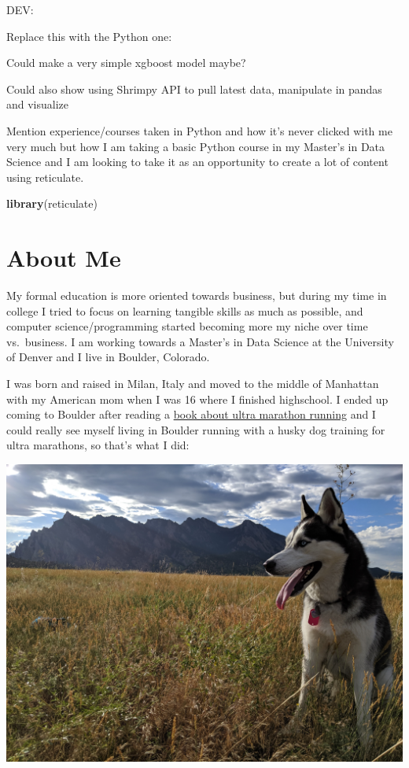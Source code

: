 \documentclass[
]{book}
\newenvironment{Shaded}{\begin{snugshade}}{\end{snugshade}}
\newcommand{\KeywordTok}[1]{\textcolor[rgb]{0.13,0.29,0.53}{\textbf{#1}}}
\newcommand{\NormalTok}[1]{#1}
\begin{document}
DEV:

Replace this with the Python one:

Could make a very simple xgboost model maybe?

Could also show using Shrimpy API to pull latest data, manipulate in pandas and visualize

Mention experience/courses taken in Python and how it's never clicked with me very much but how I am taking a basic Python course in my Master's in Data Science and I am looking to take it as an opportunity to create a lot of content using reticulate.

\begin{Shaded}
\begin{Highlighting}[]
\KeywordTok{library}\NormalTok{(reticulate)}
\end{Highlighting}
\end{Shaded}

\hypertarget{about-me}{%
\chapter{About Me}\label{about-me}}

My formal education is more oriented towards business, but during my time in college I tried to focus on learning tangible skills as much as possible, and computer science/programming started becoming more my niche over time vs.~business. I am working towards a Master's in Data Science at the University of Denver and I live in Boulder, Colorado.

I was born and raised in Milan, Italy and moved to the middle of Manhattan with my American mom when I was 16 where I finished highschool. I ended up coming to Boulder after reading a \href{http://www.scottjurek.com/eat-run}{book about ultra marathon running} and I could really see myself living in Boulder running with a husky dog training for ultra marathons, so that's what I did:

\includegraphics{images/sakura_option1.jpg}
\end{document}
